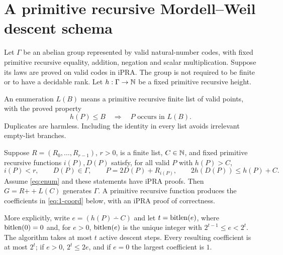 \section{A primitive recursive Mordell--Weil descent schema}
\label{sec:descent}

Let $\Gamma$ be an abelian group represented by valid natural-number codes,
with fixed primitive recursive equality, addition, negation and scalar
multiplication. Suppose its laws are proved on valid codes in iPRA.
The group is not required to be finite or to have a decidable rank.
Let $h:\Gamma\to\mathbb N$ be a fixed primitive recursive height.

An enumeration $L(B)$ means a primitive recursive finite list of valid
points, with the proved property
\[
 h(P)\le B\quad\Longrightarrow\quad P\text{ occurs in }L(B).
 \tag{3.1}\label{eq:enum}
\]
Duplicates are harmless. Including the identity in every list avoids
irrelevant empty-list branches.

\begin{theorem}\label{thm:abstract}
Suppose $R=(R_0,\ldots,R_{r-1})$, $r>0$, is a finite list, $C\in\mathbb N$,
and fixed primitive recursive functions $i(P),D(P)$ satisfy, for all
valid $P$ with $h(P)>C$,
\[
 i(P)<r,\qquad D(P)\in\Gamma,\qquad
 P=2D(P)+R_{i(P)},\qquad
 2h(D(P))\le h(P)+C.
 \tag{3.2}\label{eq:contract}
\]
Assume \eqref{eq:enum} and these statements have iPRA proofs.
Then $G=R\mathbin{+\!\!+}L(C)$ generates $\Gamma$. A primitive recursive
function produces the coefficients in \eqref{eq:1-coord} below, with an
iPRA proof of correctness.

More explicitly, write $e=(h(P)\dotminus C)$ and let
$t=\operatorname{bitlen}(e)$, where $\operatorname{bitlen}(0)=0$ and, for $e>0$, $\operatorname{bitlen}(e)$ is the unique
integer with $2^{t-1}\le e<2^t$. The algorithm takes at most $t$ active
descent steps. Every resulting coefficient is at most $2^t$; if $e>0$,
$2^t\le2e$, and if $e=0$ the largest coefficient is $1$.
\end{theorem}

